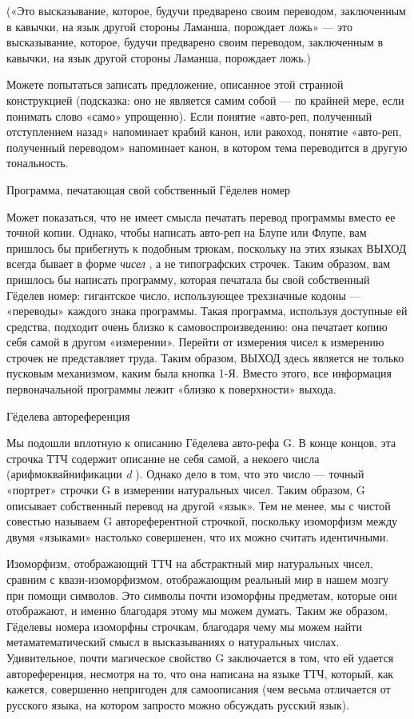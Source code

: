 («Это высказывание, которое, будучи предварено своим переводом, заключенным в кавычки, на язык другой стороны Ламанша, порождает ложь» --- это высказывание, которое, будучи предварено своим переводом, заключенным в кавычки, на язык другой стороны Ламанша, порождает ложь.)

Можете попытаться записать предложение, описанное этой странной конструкцией (подсказка: оно не является самим собой --- по крайней мере, если понимать слово «само» упрощенно). Если понятие «авто-реп, полученный отступлением назад» напоминает крабий канон, или ракоход, понятие «авто-реп, полученный переводом» напоминает канон, в котором тема переводится в другую тональность.

Программа, печатающая свой собственный Гёделев номер

Может показаться, что не имеет смысла печатать перевод программы вместо ее точной копии. Однако, чтобы написать авто-реп на Блупе или Флупе, вам пришлось бы прибегнуть к подобным трюкам, поскольку на этих языках ВЫХОД всегда бывает в форме \emph{чисел} , а не типографских строчек. Таким образом, вам пришлось бы написать программу, которая печатала бы свой собственный Гёделев номер: гигантское число, использующее трехзначные кодоны --- «переводы» каждого знака программы. Такая программа, используя доступные ей средства, подходит очень близко к самовоспроизведению: она печатает копию себя самой в другом «измерении». Перейти от измерения чисел к измерению строчек не представляет труда. Таким образом, ВЫХОД здесь является не только пусковым механизмом, каким была кнопка 1-Я. Вместо этого, все информация первоначальной программы лежит «близко к поверхности» выхода.

Гёделева автореференция

Мы подошли вплотную к описанию Гёделева авто-рефа G. В конце концов, эта строчка ТТЧ содержит описание не себя самой, а некоего числа (арифмоквайнификации \emph{d} ). Однако дело в том, что это число --- точный «портрет» строчки G в измерении натуральных чисел. Таким образом, G описывает собственный перевод на другой «язык». Тем не менее, мы с чистой совестью называем G автореферентной строчкой, поскольку изоморфизм между двумя «языками» настолько совершенен, что их можно считать идентичными.

Изоморфизм, отображающий ТТЧ на абстрактный мир натуральных чисел, сравним с квази-изоморфизмом, отображающим реальный мир в нашем мозгу при помощи символов. Это символы почти изоморфны предметам, которые они отображают, и именно благодаря этому мы можем думать. Таким же образом, Гёделевы номера изоморфны строчкам, благодаря чему мы можем найти метаматематический смысл в высказываниях о натуральных числах. Удивительное, почти магическое свойство G заключается в том, что ей удается автореференция, несмотря на то, что она написана на языке ТТЧ, который, как кажется, совершенно непригоден для самоописания (чем весьма отличается от русского языка, на котором запросто можно обсуждать русский язык).

